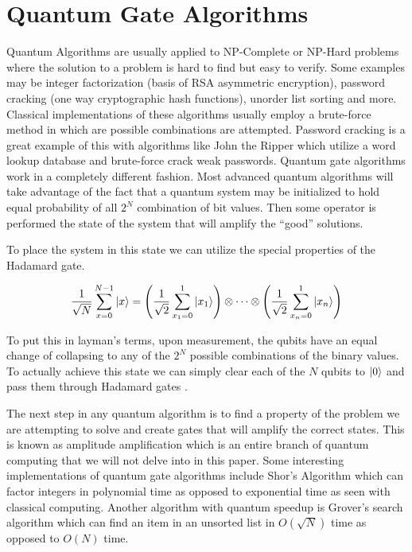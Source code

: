 \documentclass[conference]{IEEEtran}
\begin{document}
\section{Quantum Gate Algorithms}

Quantum Algorithms are usually applied to NP-Complete or NP-Hard problems where the solution to a problem is hard to find but easy to verify. Some examples may be integer factorization (basis of RSA asymmetric encryption), password cracking (one way cryptographic hash functions), unorder list sorting and more. Classical implementations of these algorithms usually employ a brute-force method in which are possible combinations are attempted. Password cracking is a great example of this with algorithms like John the Ripper which utilize a word lookup database and brute-force crack weak passwords. Quantum gate algorithms work in a completely different fashion. Most advanced quantum algorithms will take advantage of the fact that a quantum system may be initialized to hold equal probability of all $2^N$ combination of bit values. Then some operator is performed the state of the system that will amplify the ``good'' solutions.

To place the system in this state we can utilize the special properties of the Hadamard gate.

\begin{align*}
{\frac {1}{\sqrt {N}}}\sum _{x=0}^{N-1}\ket{x} =\left({\frac {1}{\sqrt {2}}}\sum _{x_{1}=0}^{1}|x_{1}\rangle \right)\otimes \cdots \otimes \left({\frac {1}{\sqrt {2}}}\sum _{x_{n}=0}^{1}\ket{x_{n}} \right)
\end{align*}

To put this in layman's terms, upon measurement, the qubits have an equal change of collapsing to any of the $2^N$ possible combinations of the binary values. To actually achieve this state we can simply clear each of the $N$ qubits to $\ket{0}$ and pass them through Hadamard gates \cite{b1}.

The next step in any quantum algorithm is to find a property of the problem we are attempting to solve and create gates that will amplify the correct states. This is known as amplitude amplification which is an entire branch of quantum computing that we will not delve into in this paper. Some interesting implementations of quantum gate algorithms include Shor's Algorithm which can factor integers in polynomial time as opposed to exponential time as seen with classical computing. Another algorithm with quantum speedup is Grover's search algorithm which can find an item in an unsorted list in $O(\sqrt{N})$ time as opposed to $O(N)$ time.
\end{document}
